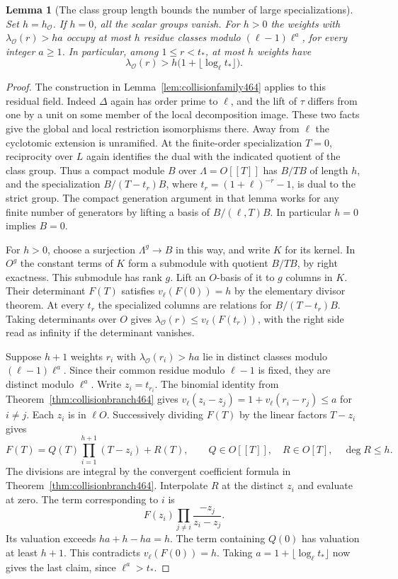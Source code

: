 \documentclass[a4paper,11pt]{article}
\newtheorem{lemma}[proposition]{Lemma}
\theoremstyle{definition}
\theoremstyle{remark}
\numberwithin{equation}{section}
\begin{document}
\begin{lemma}[The class group length bounds the number of large specializations]\leavevmode
\label{lem:classdet466}
Set \(h=h_{\mathcal O}\). If \(h=0\), all the scalar groups vanish.
For \(h>0\) the weights with \(\lambda_{\mathcal O}(r)>ha\)
occupy at most \(h\) residue classes modulo
\((\ell-1)\ell^a\), for every integer \(a\ge1\). In particular,
among \(1\le r<t_*\), at most \(h\) weights have
\[
 \lambda_{\mathcal O}(r)>
          h\bigl(1+\lfloor\log_\ell t_*\rfloor\bigr).
\]
\end{lemma}
\begin{proof}
The construction in Lemma~\ref{lem:collisionfamily464} applies to
this residual field. Indeed \(\Delta\) again has order prime to
\(\ell\), and the lift of \(\tau\) differs from one by a unit on
some member of the local decomposition image. These two facts
give the global and local restriction isomorphisms there.
Away from \(\ell\) the cyclotomic extension is unramified.
At the finite-order specialization \(T=0\), reciprocity over
\(L\) again identifies the dual with the indicated quotient of
the class group. Thus a compact module \(B\) over
\(\Lambda=O[[T]]\) has \(B/TB\) of length \(h\), and the
specialization \(B/(T-t_r)B\), where \(t_r=(1+\ell)^{-r}-1\),
is dual to the strict group. The compact generation argument in
that lemma works for any finite number of generators by lifting
a basis of \(B/(\ell,T)B\). In particular \(h=0\) implies \(B=0\).

For \(h>0\), choose a surjection \(\Lambda^g\to B\) in this way,
and write \(K\) for its kernel. In \(O^g\) the constant terms
of \(K\) form a submodule with quotient \(B/TB\), by right
exactness. This submodule has rank \(g\). Lift an \(O\)-basis
of it to \(g\) columns in \(K\). Their determinant \(F(T)\)
satisfies \(v_\ell(F(0))=h\) by the elementary divisor theorem.
At every \(t_r\) the specialized columns are relations for
\(B/(T-t_r)B\). Taking determinants over \(O\) gives
\(\lambda_{\mathcal O}(r)\le v_\ell(F(t_r))\), with the
right side read as infinity if the determinant vanishes.

Suppose \(h+1\) weights \(r_i\) with
\(\lambda_{\mathcal O}(r_i)>ha\) lie in distinct classes
modulo \((\ell-1)\ell^a\). Since their common residue modulo
\(\ell-1\) is fixed, they are distinct modulo \(\ell^a\).
Write \(z_i=t_{r_i}\). The binomial identity from
Theorem~\ref{thm:collisionbranch464} gives
\(v_\ell(z_i-z_j)=1+v_\ell(r_i-r_j)\le a\) for \(i\ne j\).
Each \(z_i\) is in \(\ell O\). Successively dividing \(F(T)\)
by the linear factors \(T-z_i\) gives
\[
 F(T)=Q(T)\prod_{i=1}^{h+1}(T-z_i)+R(T),\qquad
       Q\in O[[T]],\quad R\in O[T],\quad \deg R\le h.
\]
The divisions are integral by the convergent coefficient formula
in Theorem~\ref{thm:collisionbranch464}. Interpolate \(R\) at
the distinct \(z_i\) and evaluate at zero. The term corresponding
to \(i\) is
\[
             F(z_i)\prod_{j\ne i}\frac{-z_j}{z_i-z_j}.
\]
Its valuation exceeds \(ha+h-ha=h\). The term containing
\(Q(0)\) has valuation at least \(h+1\). This contradicts
\(v_\ell(F(0))=h\). Taking
\(a=1+\lfloor\log_\ell t_*\rfloor\) now gives the last claim,
since \(\ell^a>t_*\).
\end{proof}
\end{document}
